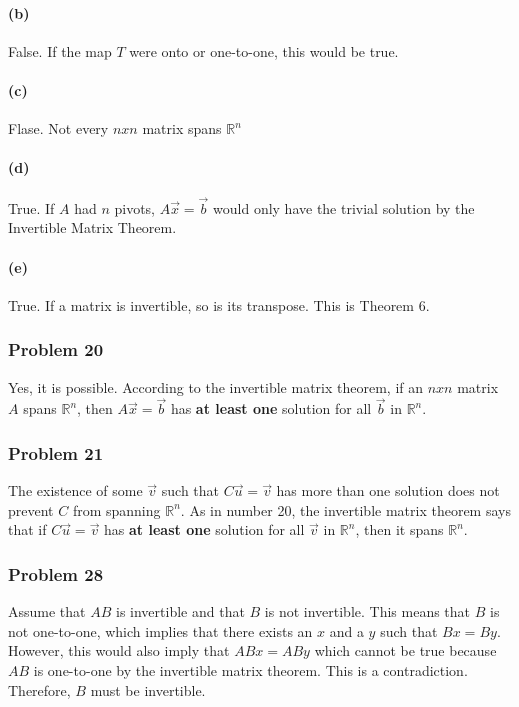 \documentclass{article}%
\begin{document}
\paragraph{(b)} False. If the map $T$ were onto or one-to-one, this would be true.
\paragraph{(c)} Flase. Not every $nxn$ matrix spans $\mathbb{R}^n$
\paragraph{(d)} True. If $A$ had $n$ pivots, $A\vec{x} = \vec{b}$ would only have the trivial solution by the Invertible Matrix Theorem.
\paragraph{(e)} True. If a matrix is invertible, so is its transpose. This is Theorem 6.

\subsubsection*{Problem 20}
Yes, it is possible. According to the invertible matrix theorem, if an $nxn$ matrix $A$ spans $\mathbb{R}^n$, then $A\vec{x} = \vec{b}$ has \textbf{at least one} solution for all $\vec{b}$ in $\mathbb{R}^n$.

\subsubsection*{Problem 21}
The existence of some $\vec{v}$ such that $C\vec{u} = \vec{v}$ has more than one solution does not prevent $C$ from spanning $\mathbb{R}^n$. As in number 20, the invertible matrix theorem says that if $C\vec{u} = \vec{v}$ has \textbf{at least one} solution for all $\vec{v}$ in $\mathbb{R}^n$, then it spans $\mathbb{R}^n$.

\subsubsection*{Problem 28}
Assume that $AB$ is invertible and that $B$ is not invertible. This means that $B$ is not one-to-one, which implies that there exists an $x$ and a $y$ such that $Bx = By$. However, this would also imply that $ABx = ABy$ which cannot be true because $AB$ is one-to-one by the invertible matrix theorem. This is a contradiction. Therefore, $B$ must be invertible.
\end{document}
